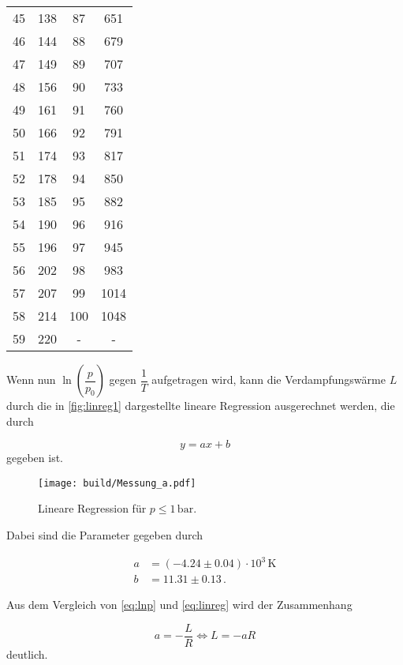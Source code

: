 \begin{table}[H]
\begin{tabular}{S[table-format=2.0] S[table-format=3.0] S[table-format=3.0] S[table-format=3.0]}
            45 & 138 & 87  & 651  \\
            46 & 144 & 88  & 679  \\
            47 & 149 & 89  & 707  \\
            48 & 156 & 90  & 733  \\
            49 & 161 & 91  & 760  \\
            50 & 166 & 92  & 791  \\
            51 & 174 & 93  & 817  \\
            52 & 178 & 94  & 850  \\
            53 & 185 & 95  & 882  \\
            54 & 190 & 96  & 916  \\
            55 & 196 & 97  & 945  \\
            56 & 202 & 98  & 983  \\
            57 & 207 & 99  & 1014 \\
            58 & 214 & 100 & 1048 \\
            59 & 220 & {-} & {-}  \\
      \bottomrule
    \end{tabular}
  \end{table}

Wenn nun $\ln{\left(\dfrac{p}{p_0} \right)}$ gegen $\dfrac{1}{T}$ aufgetragen wird, kann die Verdampfungswärme $L$ durch die in \autoref{fig:linreg1} dargestellte lineare Regression ausgerechnet werden, die durch

\begin{equation}
  y = a x + b
  \label{eq:linreg}
\end{equation} gegeben ist.

\begin{figure}
  \centering
  \texttt{[image: build/Messung\_a.pdf]}
  \caption{Lineare Regression für $p \leq 1 \,\unit{\bar}$.}
  \label{fig:linreg1}
\end{figure}

Dabei sind die Parameter gegeben durch 

\begin{align*}
a & = (-4.24 \pm 0.04) \cdot 10^3 \, \unit{\kelvin}\\
b & = 11.31 \pm 0.13 \,.
\end{align*}

Aus dem Vergleich von \eqref{eq:lnp} und \eqref{eq:linreg} wird der Zusammenhang

\begin{equation*}
  a = - \frac{L}{R} \Leftrightarrow L = -a R
\end{equation*} deutlich.


